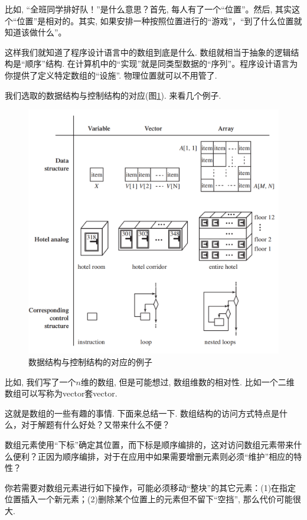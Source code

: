 比如, “全班同学排好队！”是什么意思？首先, 每人有了一个“位置”。然后, 其实这个“位置”是相对的。其实, 如果安排一种按照位置进行的“游戏”，“到了什么位置就知道该做什么”。

这样我们就知道了程序设计语言中的数组到底是什么. 数组就相当于抽象的逻辑结构是“顺序”结构. 在计算机中的“实现”就是同类型数据的“序列”。程序设计语言为你提供了定义特定数组的“设施”. 物理位置就可以不用管了. 

我们选取的数据结构与控制结构的对应(图\ref{figs:cflow}). 来看几个例子. 

\begin{figure}
	\centering
	\includegraphics[scale=0.5]{4-programs/figs/structures}
	\caption{数据结构与控制结构的对应的例子}
	\label{figs:cflow}
	
\end{figure}

比如, 我们写了一个$n$维的数组, 但是可能想过, 数组维数的相对性. 比如一个二维数组可以写称为vector套vector. 

这就是数组的一些有趣的事情. 下面来总结一下. 数组结构的访问方式特点是什么，对于解题有什么好处？又带来什么不便？

数组元素使用“下标”确定其位置，而下标是顺序编排的，这对访问数组元素带来什么便利？正因为顺序编排，对于在应用中如果需要增删元素则必须“维护”相应的特性？

你若需要对数组元素进行如下操作，可能必须移动“整块”的其它元素：(1)在指定位置插入一个新元素；(2)删除某个位置上的元素但不留下“空挡”, 那么代价可能很大. 

